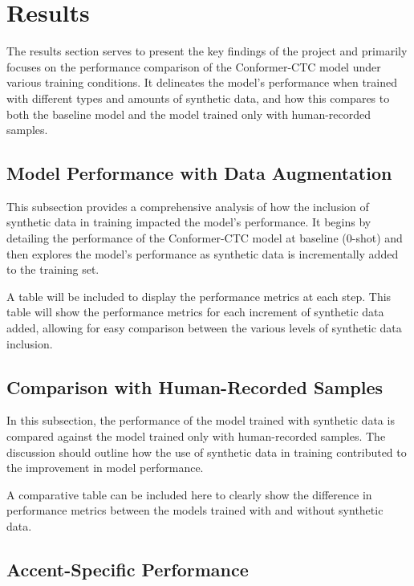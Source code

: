 \documentclass[
]{article}
\begin{document}
\hypertarget{results}{%
\section{Results}\label{results}}

The results section serves to present the key findings of the project
and primarily focuses on the performance comparison of the Conformer-CTC
model under various training conditions. It delineates the model's
performance when trained with different types and amounts of synthetic
data, and how this compares to both the baseline model and the model
trained only with human-recorded samples.

\hypertarget{model-performance-with-data-augmentation}{%
\subsection{Model Performance with Data
Augmentation}\label{model-performance-with-data-augmentation}}

This subsection provides a comprehensive analysis of how the inclusion
of synthetic data in training impacted the model's performance. It
begins by detailing the performance of the Conformer-CTC model at
baseline (0-shot) and then explores the model's performance as synthetic
data is incrementally added to the training set.

A table will be included to display the performance metrics at each
step. This table will show the performance metrics for each increment of
synthetic data added, allowing for easy comparison between the various
levels of synthetic data inclusion.

\hypertarget{comparison-with-human-recorded-samples}{%
\subsection{Comparison with Human-Recorded
Samples}\label{comparison-with-human-recorded-samples}}

In this subsection, the performance of the model trained with synthetic
data is compared against the model trained only with human-recorded
samples. The discussion should outline how the use of synthetic data in
training contributed to the improvement in model performance.

A comparative table can be included here to clearly show the difference
in performance metrics between the models trained with and without
synthetic data.

\hypertarget{accent-specific-performance}{%
\subsection{Accent-Specific
Performance}\label{accent-specific-performance}}
\end{document}

